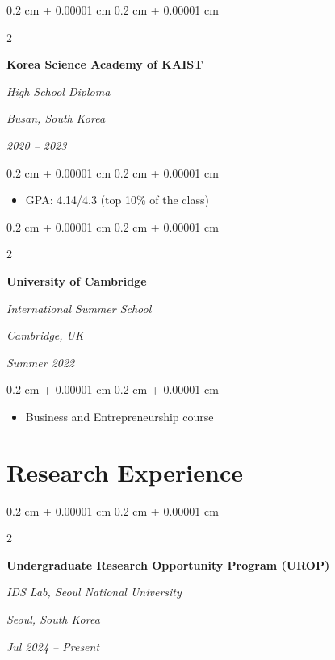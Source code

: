 \documentclass[10pt, letterpaper]{article}
\newenvironment{highlights}{
    \begin{itemize}[
        topsep=0.10 cm,
        parsep=0.10 cm,
        partopsep=0pt,
        itemsep=0pt,
        leftmargin=0.4 cm + 10pt
    ]
}{
    \end{itemize}
} %
\newenvironment{onecolentry}{
    \begin{adjustwidth}{
        0.2 cm + 0.00001 cm
    }{
        0.2 cm + 0.00001 cm
    }
}{
    \end{adjustwidth}
} %
\newenvironment{twocolentry}[2][]{
    \onecolentry
    \def\secondColumn{#2}
    \setcolumnwidth{\fill, 4.5 cm}
    \begin{paracol}{2}
}{
    \switchcolumn \raggedleft \secondColumn
    \end{paracol}
    \endonecolentry
} %
\begin{document}
        \vspace{0.2 cm}

        \begin{twocolentry}{
        \textit{Busan, South Korea}    
            
        \textit{2020 – 2023}}
            \textbf{Korea Science Academy of KAIST}
            
            \textit{High School Diploma}
        \end{twocolentry}

        \vspace{0.10 cm}
        \begin{onecolentry}
            \begin{highlights}
                \item GPA: 4.14/4.3 (top 10\% of the class)
            \end{highlights}
        \end{onecolentry}

        \vspace{0.2 cm}

        \begin{twocolentry}{
        \textit{Cambridge, UK}    
            
        \textit{Summer 2022}}
            \textbf{University of Cambridge}
            
            \textit{International Summer School}
        \end{twocolentry}

        \vspace{0.10 cm}
        \begin{onecolentry}
            \begin{highlights}
                \item Business and Entrepreneurship course
            \end{highlights}
        \end{onecolentry}
    
    \section{Research Experience}
        
        \begin{twocolentry}{
        \textit{Seoul, South Korea}    
            
        \textit{Jul 2024 – Present}}
            \textbf{Undergraduate Research Opportunity Program (UROP)}
            
            \textit{IDS Lab, Seoul National University}
        \end{twocolentry}
\end{document}
